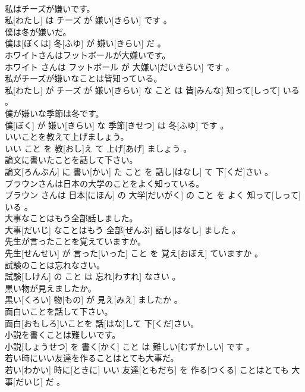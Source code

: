 \documentclass[8pt]{extreport}
\begin{document}
\begin{CJK}{UTF8}{min}
\\	私はチーズが嫌いです。	
\\	私[わたし] は チーズ が 嫌い[きらい] です 。
\\	僕は冬が嫌いだ。	
\\	僕は[ぼくは] 冬[ふゆ] が 嫌い[きらい] だ 。
\\	ホワイトさんはフットボールが大嫌いです。	
\\	ホワイト さんは フットボール が 大嫌い[だいきらい] です 。
\\	私がチーズが嫌いなことは皆知っている。	
\\	私[わたし] が チーズ が 嫌い[きらい] な こと は 皆[みんな] 知って[しって] いる 。
\\	僕が嫌いな季節は冬です。	
\\	僕[ぼく] が 嫌い[きらい] な 季節[きせつ] は 冬[ふゆ] です 。
\\	いいことを教えて上げましょう。	
\\	いい こと を 教[おし]え て 上げ[あげ] ましょう 。
\\	論文に書いたことを話して下さい。	
\\	論文[ろんぶん] に 書い[かい] た こと を 話し[はなし] て 下[くだ]さい 。
\\	ブラウンさんは日本の大学のことをよく知っている。	
\\	ブラウン さんは 日本[にほん] の 大学[だいがく] の こと を よく 知って[しって] いる 。
\\	大事なことはもう全部話しました。	
\\	大事[だいじ] なことはもう 全部[ぜんぶ] 話し[はなし] ました 。
\\	先生が言ったことを覚えていますか。	
\\	先生[せんせい] が 言った[いった] こと を 覚え[おぼえ] ていますか 。
\\	試験のことは忘れなさい。	
\\	試験[しけん] の こと は 忘れ[わすれ] なさい 。
\\	黒い物が見えましたか。	
\\	黒い[くろい] 物[もの] が 見え[みえ] ましたか 。
\\	面白いことを話して下さい。	
\\	面白[おもしろ]いことを 話[はな]して 下[くだ]さい。
\\	小説を書くことは難しいです。	
\\	小説[しょうせつ] を 書く[かく] こと は 難しい[むずかしい] です 。
\\	若い時にいい友達を作ることはとても大事だ。	
\\	若い[わかい] 時に[ときに] いい 友達[ともだち] を 作る[つくる] ことはとても 大事[だいじ] だ 。

\end{CJK}
\end{document}
